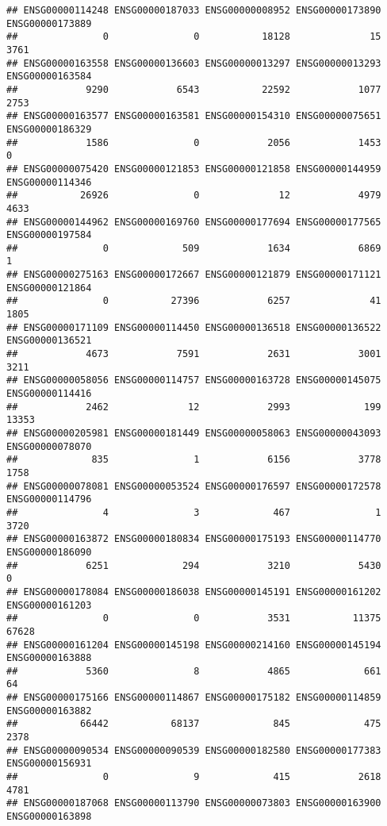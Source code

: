 \documentclass[
]{article}
\begin{document}
\begin{verbatim}
## ENSG00000114248 ENSG00000187033 ENSG00000008952 ENSG00000173890 ENSG00000173889 
##               0               0           18128              15            3761 
## ENSG00000163558 ENSG00000136603 ENSG00000013297 ENSG00000013293 ENSG00000163584 
##            9290            6543           22592            1077            2753 
## ENSG00000163577 ENSG00000163581 ENSG00000154310 ENSG00000075651 ENSG00000186329 
##            1586               0            2056            1453               0 
## ENSG00000075420 ENSG00000121853 ENSG00000121858 ENSG00000144959 ENSG00000114346 
##           26926               0              12            4979            4633 
## ENSG00000144962 ENSG00000169760 ENSG00000177694 ENSG00000177565 ENSG00000197584 
##               0             509            1634            6869               1 
## ENSG00000275163 ENSG00000172667 ENSG00000121879 ENSG00000171121 ENSG00000121864 
##               0           27396            6257              41            1805 
## ENSG00000171109 ENSG00000114450 ENSG00000136518 ENSG00000136522 ENSG00000136521 
##            4673            7591            2631            3001            3211 
## ENSG00000058056 ENSG00000114757 ENSG00000163728 ENSG00000145075 ENSG00000114416 
##            2462              12            2993             199           13353 
## ENSG00000205981 ENSG00000181449 ENSG00000058063 ENSG00000043093 ENSG00000078070 
##             835               1            6156            3778            1758 
## ENSG00000078081 ENSG00000053524 ENSG00000176597 ENSG00000172578 ENSG00000114796 
##               4               3             467               1            3720 
## ENSG00000163872 ENSG00000180834 ENSG00000175193 ENSG00000114770 ENSG00000186090 
##            6251             294            3210            5430               0 
## ENSG00000178084 ENSG00000186038 ENSG00000145191 ENSG00000161202 ENSG00000161203 
##               0               0            3531           11375           67628 
## ENSG00000161204 ENSG00000145198 ENSG00000214160 ENSG00000145194 ENSG00000163888 
##            5360               8            4865             661              64 
## ENSG00000175166 ENSG00000114867 ENSG00000175182 ENSG00000114859 ENSG00000163882 
##           66442           68137             845             475            2378 
## ENSG00000090534 ENSG00000090539 ENSG00000182580 ENSG00000177383 ENSG00000156931 
##               0               9             415            2618            4781 
## ENSG00000187068 ENSG00000113790 ENSG00000073803 ENSG00000163900 ENSG00000163898 

\end{verbatim}
\end{document}
